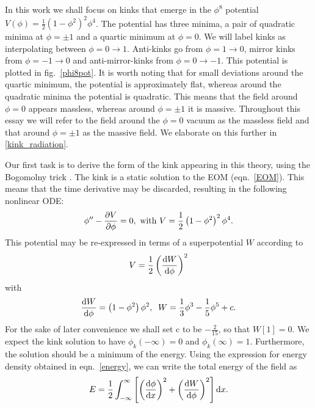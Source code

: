\documentclass[11pt, oneside]{article}  	%
\numberwithin{equation}{section}
\newcommand{\drv}{\ensuremath{\textup{d}}}
\begin{document}
 In this work we shall focus on kinks that emerge in the $\phi^8$ potential $V(\phi) = \frac{1}{2} \left ( 1 - \phi^2\right)^2 \phi^4$. The potential has three minima, a pair of quadratic minima at $\phi = \pm1$ and a quartic minimum at $\phi= 0$. We will label kinks as interpolating between $\phi = 0 \rightarrow 1$. Anti-kinks go from $\phi = 1 \rightarrow 0$, mirror kinks from $\phi = -1 \rightarrow 0$ and anti-mirror-kinks from $\phi = 0\rightarrow -1$. This potential is plotted in fig.~\ref{phi8pot}. It is worth noting that for small deviations around the quartic minimum, the potential is approximately flat, whereas around the quadratic minima the potential is quadratic. This means that the field around $\phi = 0$ appears massless, whereas around $\phi = \pm1$ it is massive. Throughout this essay we will refer to the field around the $\phi = 0$ vacuum as the massless field and that around $\phi = \pm1$ as the massive field. We elaborate on this further in \textsection \ref{kink_radiation}.\par
 Our first task is to derive the form of the kink appearing in this theory, using the Bogomolny trick \cite{bogomolny}. The kink is a static solution to the EOM (eqn.~\ref{EOM}). This means that the time derivative may be discarded, resulting in the following nonlinear ODE:
 \begin{equation} \label{kink_equation}
 {\phi}'' - \frac{\partial V}{\partial \phi} = 0, \textup{ with } V = \frac{1}{2} \left ( 1 - \phi^2\right)^2 \phi^4.
 \end{equation}
 This potential may be re-expressed in terms of a superpotential $W$ according to
 \begin{equation}
 V = \frac{1}{2} \left ( \frac{\textup{d}W}{\textup{d}\phi}\right )^2
 \end{equation}
 with
 \begin{equation}\label{dw}
 \frac{\textup{d}W}{\textup{d}\phi} = \left ( 1 - \phi^2 \right ) \phi^2 ,\; \;W = \frac{1}{3}\phi^3 - \frac{1}{5}\phi^5 +c.
 \end{equation}
For the sake of later convenience we shall set c to be $-\frac{2}{15}$, so that $W[1]=0$. We expect the kink solution to have $\phi_k (-\infty )= 0$ and $\phi_k (\infty )= 1$. Furthermore, the solution should be a minimum of the energy. Using the expression for energy density obtained in eqn.~\ref{energy}, we can write the total energy of the field as
 \begin{equation}\label{EW}
E = \frac{1}{2} \int_{-\infty}^{\infty} \left [ \left(\frac{\textup{d}\phi}{\textup{d}x}\right)^2 + \left(\frac{\textup{d}W}{\textup{d}\phi}\right)^2 \right ]\drv x.
 \end{equation}
\end{document}
